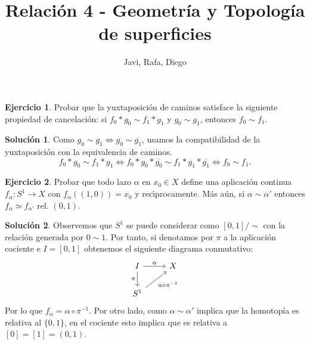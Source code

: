 \documentclass{article}
\theoremstyle{plain}
\theoremstyle{definition}
\newtheorem{exercise}{Ejercicio}
\newtheorem*{sol*}{Solución}
\begin{document}
\title{Relación 4 - Geometría y Topología de superficies }
\author{Javi, Rafa, Diego}
\maketitle
\begin{exercise} Probar que la yuxtaposici\'on de caminos satisface la siguiente propiedad de cancelaci\'on: si $f_0*g_0 \sim f_1* g_1$ y $g_0 \sim g_1$, entonces $f_0 \sim f_1$.
\end{exercise}
\begin{sol*}
Como $g_0 \sim g_1\Leftrightarrow \overline{g_0}\sim\overline{g_1}$, usamos la compatibilidad de la yuxtaposición con la equivalencia de caminos.
\[
f_0*g_0 \sim f_1* g_1\Leftrightarrow f_0*g_0*\overline{g_0}\sim f_1*g_1*\overline{g_1}\Leftrightarrow f_0\sim f_1.
\]
\end{sol*}

\vspace{0.1cm}

\newpage \begin{exercise} \label{s1}Probar que todo lazo $\alpha$ en $x_0\in X$ define una aplicaci\'on continua $f_\alpha: S^1 \to X$ con $f_\alpha((1,0)) = x_0$ y rec\'{\i}procamente. M\'as a\'un, si $\alpha \sim \alpha'$ entonces $f_{\alpha} \simeq f_{\alpha'} \mbox{ rel. } (0,1)$.
\end{exercise}
\begin{sol*}
Observemos que $S^1$ se puede considerar como $[0,1]/\sim$ con la relación generada por $0\sim 1$. Por tanto, si denotamos por $\pi$ a la aplicación cociente e $I=[0,1]$ obtenemos el siguiente diagrama conmutativo:
\[
\begin{tikzcd}
I\arrow[r,"\alpha"]\arrow[d,"\pi"'] & X\\
S^1\arrow[ur,"\alpha\circ\pi^{-1}"']
\end{tikzcd}
\]
Por lo que $f_\alpha=\alpha\circ\pi^{-1}$. Por otro lado, como $\alpha\sim\alpha'$ implica que la homotopía es relativa al $\{0,1\}$, en el cociente esto implica que es relativa a $[0]=[1]=(0,1)$. 
\end{sol*}

\vspace{0.1cm}
\end{document}
